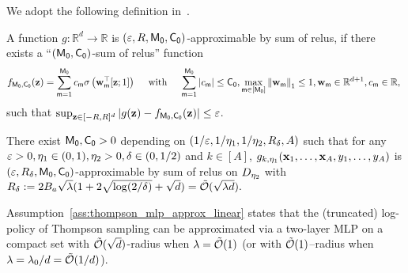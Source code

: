 We adopt the following definition in~\cite{bai2023transformers}. 
\begin{definition}\label{def:general_mlp_approx_new}
     A function $g: \mathbb{R}^d \rightarrow \mathbb{R}$ is $(\varepsilon, R, {\mathsf{M_0}}, {{\mathsf{C_0}}})$-approximable by sum of relus, if there exists a ``$({\mathsf{M_0}}, {{\mathsf{C_0}}})$-sum of relus'' function
\begin{align*}
f_{{\mathsf{M_0}}, {{\mathsf{C_0}}}}(\mathbf{z})=\sum_{{\mathsf{m}}=1}^{\mathsf{M_0}} c_{\mathsf{m}} \sigma\left(\mathbf{w}_{\mathsf{m}}^{\top}[\mathbf{z} ; 1]\right) \quad \text { with } \quad \sum_{{\mathsf{m}}=1}^{\mathsf{M_0}}\left|c_{\mathsf{m}}\right| \leq {{\mathsf{C_0}}}, \max _{{\mathsf{m}} \in[{\mathsf{M_0}}]}\left\|\mathbf{w}_{\mathsf{m}}\right\|_1 \leq 1, \mathbf{w}_{\mathsf{m}} \in \mathbb{R}^{d+1},c_{\mathsf{m}} \in \mathbb{R},~
\end{align*}
such that $\sup _{\mathbf{z} \in[-R, R]^d}\left|g(\mathbf{z})-f_{{\mathsf{M_0}},{{\mathsf{C_0}}}}(\mathbf{z})\right| \leq \varepsilon$.

\end{definition}



\begin{assumption}\label{ass:thompson_mlp_approx_linear}
 There exist  ${\mathsf{M_0}},{{\mathsf{C_0}}}>0$  depending on $(1/\varepsilon,1/{\eta_1},\\1/{\eta_2},R_\delta,A)$  such that for any $\varepsilon>0,{\eta_1}\in(0,1),{\eta_2}>0,\delta\in(0,1/2)$ and $k\in[A]$, $g_{k,{\eta_1}}({\mathbf x}_1,\ldots,{\mathbf x}_A,y_1,\ldots,y_A)$ is $(\varepsilon,R_\delta,{\mathsf{M_0}},{{\mathsf{C_0}}})$-approximable by sum of relus on ${D}_{\eta_2}$ with
$
R_\delta:=2B_a\sqrt{\lambda}(1+2\sqrt{\log(2/\delta)}+\sqrt{d})={\tilde{\mathcal O}}(\sqrt{\lambda d}).
$

\end{assumption}
Assumption~\ref{ass:thompson_mlp_approx_linear} states that the (truncated) log-policy of  Thompson sampling  can be approximated via a two-layer MLP on a compact set with  ${\tilde{\mathcal O}}(\sqrt{d})$-radius when $\lambda={\tilde{\mathcal O}}(1)$ (or with ${\tilde{\mathcal O}}(1)$--radius when $\lambda=\lambda_0/d={\tilde{\mathcal O}}(1/d)$).  %

